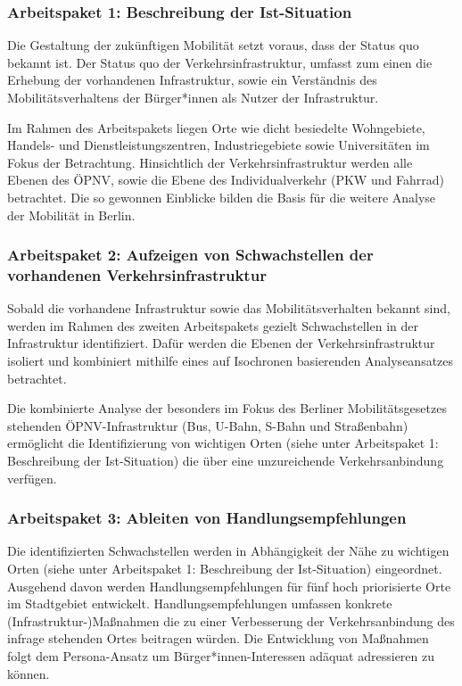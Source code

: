 \subsubsection{Arbeitspaket 1: Beschreibung der Ist-Situation}

Die Gestaltung der zukünftigen Mobilität setzt voraus, dass der Status quo bekannt ist. Der Status quo der Verkehrsinfrastruktur, umfasst zum einen die Erhebung der vorhandenen Infrastruktur, sowie ein Verständnis des Mobilitätsverhaltens der Bürger*innen als Nutzer der Infrastruktur.

Im Rahmen des Arbeitspakets liegen Orte wie dicht besiedelte Wohngebiete, Handels- und Dienstleistungszentren, Industriegebiete sowie Universitäten im Fokus der Betrachtung. Hinsichtlich der Verkehrsinfrastruktur werden alle Ebenen des ÖPNV, sowie die Ebene des Individualverkehr (PKW und Fahrrad) betrachtet. Die so gewonnen Einblicke bilden die Basis für die weitere Analyse der Mobilität in Berlin.

\subsubsection{Arbeitspaket 2: Aufzeigen von Schwachstellen der vorhandenen Verkehrsinfrastruktur}

Sobald die vorhandene Infrastruktur sowie das Mobilitätsverhalten bekannt sind, werden im Rahmen des zweiten Arbeitspakets gezielt Schwachstellen in der Infrastruktur identifiziert. Dafür werden die Ebenen der Verkehrsinfrastruktur isoliert und kombiniert mithilfe eines auf Isochronen basierenden Analyseansatzes betrachtet.

Die kombinierte Analyse der besonders im Fokus des Berliner Mobilitätsgesetzes stehenden ÖPNV-Infrastruktur (Bus, U-Bahn, S-Bahn und Straßenbahn) ermöglicht die Identifizierung von wichtigen Orten (siehe unter Arbeitspaket 1: Beschreibung der Ist-Situation) die über eine unzureichende Verkehrsanbindung verfügen.

\subsubsection{Arbeitspaket 3: Ableiten von Handlungsempfehlungen}

Die identifizierten Schwachstellen werden in Abhängigkeit der Nähe zu wichtigen Orten (siehe unter Arbeitspaket 1: Beschreibung der Ist-Situation) eingeordnet. Ausgehend davon werden Handlungsempfehlungen für fünf hoch priorisierte Orte im Stadtgebiet entwickelt. Handlungsempfehlungen umfassen konkrete (Infrastruktur-)Maßnahmen die zu einer Verbesserung der Verkehrsanbindung des infrage stehenden Ortes beitragen würden. Die Entwicklung von Maßnahmen folgt dem Persona-Ansatz um Bürger*innen-Interessen adäquat adressieren zu können.

